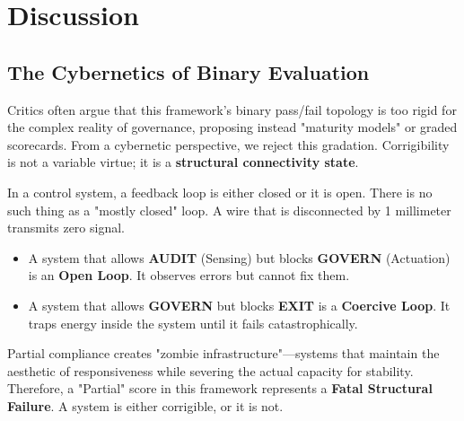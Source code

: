 \section{Discussion}
\label{sec:discussion}

\subsection{The Cybernetics of Binary Evaluation}

Critics often argue that this framework's binary pass/fail topology is too rigid for the complex reality of governance, proposing instead "maturity models" or graded scorecards. From a cybernetic perspective, we reject this gradation. Corrigibility is not a variable virtue; it is a \textbf{structural connectivity state}.

In a control system, a feedback loop is either closed or it is open. There is no such thing as a "mostly closed" loop. A wire that is disconnected by 1 millimeter transmits zero signal.

\begin{itemize}
    \item A system that allows \textbf{AUDIT} (Sensing) but blocks \textbf{GOVERN} (Actuation) is an \textbf{Open Loop}. It observes errors but cannot fix them.
    \item A system that allows \textbf{GOVERN} but blocks \textbf{EXIT} is a \textbf{Coercive Loop}. It traps energy inside the system until it fails catastrophically.
\end{itemize}

Partial compliance creates "zombie infrastructure"---systems that maintain the aesthetic of responsiveness while severing the actual capacity for stability. Therefore, a "Partial" score in this framework represents a \textbf{Fatal Structural Failure}. A system is either corrigible, or it is not.

